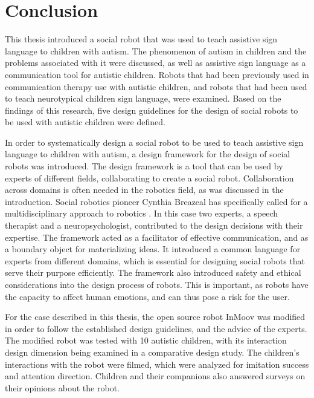 \chapter{Conclusion}
\label{chapter:conclusion}


This thesis introduced a social robot that was used to teach assistive sign language to children with autism. The phenomenon of autism in children and the problems associated with it were discussed, as well as assistive sign language as a communication tool for autistic children. Robots that had been previously used in communication therapy use with autistic children, and robots that had been used to teach neurotypical children sign language, were examined. Based on the findings of this research, five design guidelines for the design of social robots to be used with autistic children were defined. 

In order to systematically design a social robot to be used to teach assistive sign language to children with autism, a design framework for the design of social robots was introduced. The design framework is a tool that can be used by experts of different fields, collaborating to create a social robot. Collaboration across domains is often needed in the robotics field, as was discussed in the introduction. Social robotics pioneer Cynthia Breazeal has specifically called for a multidisciplinary approach to robotics \cite{Breazeal2008}. In this case two experts, a speech therapist and a neuropsychologist, contributed to the design decisions with their expertise. The framework acted as a facilitator of effective communication, and as a boundary object for materializing ideas. It introduced a common language for experts from different domains, which is essential for designing social robots that serve their purpose efficiently. The framework also introduced safety and ethical considerations into the design process of robots. This is important, as robots have the capacity to affect human emotions, and can thus pose a risk for the user.

For the case described in this thesis, the open source robot InMoov was modified in order to follow the established design guidelines, and the advice of the experts. The modified robot was tested with 10 autistic children, with its interaction design dimension being examined in a comparative design study. The children's interactions with the robot were filmed, which were analyzed for imitation success and attention direction. Children and their companions also answered surveys on their opinions about the robot. 

